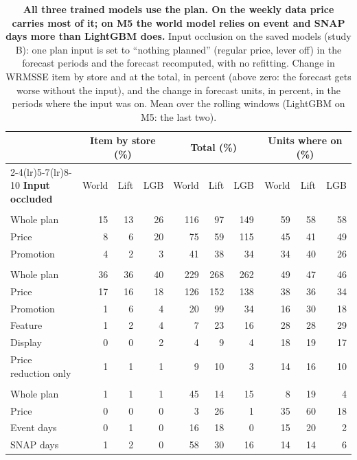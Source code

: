 \begin{table}[t]
\centering
\caption{\textbf{All three trained models use the plan. On the weekly data price carries most of it; on M5 the world
model relies on event and SNAP days more than LightGBM does.} Input occlusion on the saved models (study B): one plan input is set to
``nothing planned'' (regular price, lever off) in the forecast periods and the forecast recomputed, with no refitting.
Change in WRMSSE item by store and at the total, in percent (above zero: the forecast gets worse without the input),
and the change in forecast units, in percent, in the periods where the input was on. Mean over the rolling windows (LightGBM on M5: the
last two).}
\label{tab:perturbation}
\footnotesize
\setlength{\tabcolsep}{3.6pt}
\begin{tabular}{l*{9}{r}}
\toprule
 & \multicolumn{3}{c}{\textbf{Item by store (\%)}} & \multicolumn{3}{c}{\textbf{Total (\%)}}
 & \multicolumn{3}{c}{\textbf{Units where on (\%)}} \\
\cmidrule(lr){2-4}\cmidrule(lr){5-7}\cmidrule(lr){8-10}
\textbf{Input occluded} & World & Lift & LGB & World & Lift & LGB & World & Lift & LGB \\
\midrule
\addlinespace[2pt]\multicolumn{10}{l}{\itshape Dominick's} \\
Whole plan & 15 & 13 & 26 & 116 & 97 & 149 & \textminus{}59 & \textminus{}58 & \textminus{}58 \\
Price & 8 & 6 & 20 & 75 & 59 & 115 & \textminus{}45 & \textminus{}41 & \textminus{}49 \\
Promotion & 4 & 2 & 3 & 41 & 38 & 34 & \textminus{}34 & \textminus{}40 & \textminus{}26 \\
\addlinespace[2pt]\multicolumn{10}{l}{\itshape Frat} \\
Whole plan & 36 & 36 & 40 & 229 & 268 & 262 & \textminus{}49 & \textminus{}47 & \textminus{}46 \\
Price & 17 & 16 & 18 & 126 & 152 & 138 & \textminus{}38 & \textminus{}36 & \textminus{}34 \\
Promotion & \textminus{}1 & 6 & 4 & 20 & 99 & 34 & \textminus{}16 & \textminus{}30 & \textminus{}18 \\
Feature & 1 & 2 & 4 & 7 & 23 & 16 & \textminus{}28 & \textminus{}28 & \textminus{}29 \\
Display & 0 & 0 & 2 & 4 & 9 & 4 & \textminus{}18 & \textminus{}19 & \textminus{}17 \\
Price reduction only & 1 & 1 & 1 & 9 & 10 & 3 & 14 & 16 & 10 \\
\addlinespace[2pt]\multicolumn{10}{l}{\itshape M5} \\
Whole plan & 1 & 1 & 1 & 45 & 14 & 15 & \textminus{}8 & \textminus{}19 & \textminus{}4 \\
Price & 0 & 0 & 0 & 3 & \textminus{}26 & \textminus{}1 & \textminus{}35 & \textminus{}60 & 18 \\
Event days & 0 & 1 & 0 & 16 & 18 & 0 & 15 & 20 & 2 \\
SNAP days & 1 & 2 & 0 & 58 & 30 & 16 & \textminus{}14 & \textminus{}14 & \textminus{}6 \\
\bottomrule
\end{tabular}
\end{table}
